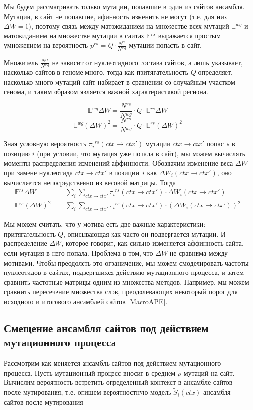 \documentclass[a4paper]{article}
\newcommand\wg{{}^{wg}}
\newcommand\rs{{}^{rs}}
\newcommand\dirctx{ctx\to ctx'}
\newcommand\sumdirctx{\sum_{\dirctx}}
\begin{document}
Мы будем рассматривать только мутации, попавшие в один из сайтов ансамбля. Мутации, в сайт не попавшие, афинность изменить не могут (т.е. для них $\Delta W=0$), поэтому связь между матожиданием на множестве всех мутаций $\mathbb{E}\wg$ и матожиданием на множестве мутаций в сайтах $\mathbb{E}\rs$ выражается простым умножением на вероятность $p\rs=Q\cdot\frac{N\rs}{N\wg}$ мутации попасть в сайт.

Множитель $\frac{N\rs}{N\wg}$ не зависит от нуклеотидного состава сайтов, а лишь указывает, насколько сайтов в геноме много, тогда как притягательность $Q$ определяет, насколько много мутаций сайт набирает в сравнении со случайным участком генома, и таким образом является важной характеристикой региона.

$$\mathbb{E}\wg\Delta W = \frac{N\rs}{N\wg}\cdot Q\cdot\mathbb{E}\rs\Delta W$$
$$\mathbb{E}\wg(\Delta W)^2 = \frac{N\rs}{N\wg}\cdot Q\cdot\mathbb{E}\rs\left(\Delta W\right)^2$$

Зная условную вероятность $\pi_i\rs(\dirctx)$ мутации $\dirctx$ попасть в позицию $i$ (при условии, что мутация уже попала в сайт), мы можем вычислять моменты распределения изменений аффинности.
Обозначим изменение веса $\Delta W$ при замене нуклеотида $\dirctx$ в позиции~$i$ как $\Delta W_i(\dirctx)$, оно вычисляется непосредственно из весовой матрицы. Тогда
\begin{align}
\mathbb{E}\rs\Delta W &= \sum_i\sumdirctx \pi_i\rs(\dirctx)\cdot\Delta W_i(\dirctx)\\
\mathbb{E}\rs(\Delta W)^2 &= \sum_i\sumdirctx \pi_i\rs(\dirctx)\cdot\left(\Delta W_i(\dirctx)\right)^2
\end{align}

Мы можем считать, что у мотива есть две важные характеристики: притягательность $Q$, описывающая как часто он подвергается мутации. И распределение $\Delta W$, которое говорит, как сильно изменяется аффинность сайта, если мутация в него попала. Проблема в том, что $\Delta W$ не сравнима между мотивами. Чтобы преодолеть это ограничение, мы можем смоделировать частоты нуклеотидов в сайтах, подвергшихся действию мутационного процесса, и затем сравнить частотные матрицы одним из множества методов. Например, мы можем сравнить пересечение множества слов, преодолевающих некоторый порог для исходного и итогового ансамблей сайтов [MacroAPE].

\subsection*{Смещение ансамбля сайтов под действием мутационного процесса}
\label{sub:ensemble_shift}
Рассмотрим как меняется ансамбль сайтов под действием мутационного процесса. Пусть мутационный процесс вносит в среднем $\rho$ мутаций на сайт. Вычислим вероятность встретить определенный контекст в ансамбле сайтов после мутирования, т.е. опишем вероятностную модель $\widetilde{S}_i(ctx)$ ансамбля сайтов после мутирования.
\end{document}
